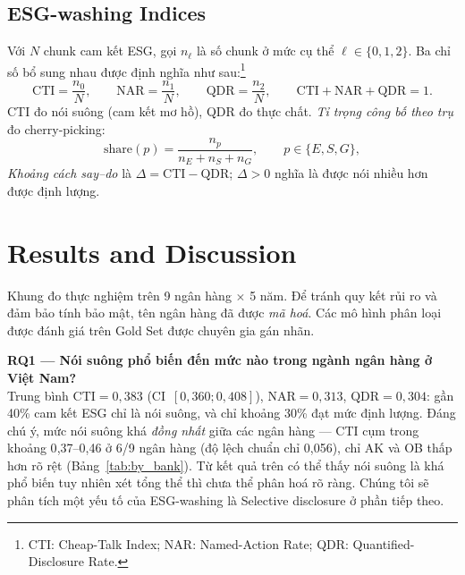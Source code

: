 \documentclass[runningheads]{llncs}
\begin{document}
\subsection{ESG-washing Indices}
Với $N$ chunk cam kết ESG, gọi $n_\ell$ là số chunk ở mức cụ thể $\ell\in\{0,1,2\}$. Ba chỉ số bổ sung nhau được định nghĩa như sau:\footnote{CTI: Cheap-Talk Index; NAR: Named-Action Rate; QDR: Quantified-Disclosure Rate.}
\begin{equation}
\mathrm{CTI}=\frac{n_0}{N},\qquad
\mathrm{NAR}=\frac{n_1}{N},\qquad
\mathrm{QDR}=\frac{n_2}{N},\qquad
\mathrm{CTI}+\mathrm{NAR}+\mathrm{QDR}=1.
\end{equation}
CTI đo nói suông (cam kết mơ hồ), QDR đo thực chất. \emph{Tỉ trọng công bố theo trụ} đo cherry-picking:
\begin{equation}
\mathrm{share}(p)=\frac{n_p}{n_E+n_S+n_G},\qquad p\in\{E,S,G\},
\end{equation}
\emph{Khoảng cách say--do} là $\Delta=\mathrm{CTI}-\mathrm{QDR}$; $\Delta>0$ nghĩa là được nói nhiều hơn được định lượng.


\section{Results and Discussion}
Khung đo thực nghiệm trên 9 ngân hàng $\times$ 5 năm. Để tránh quy kết rủi ro và đảm bảo tính bảo mật, tên ngân hàng đã được \emph{mã hoá}. Các mô hình phân loại được đánh giá trên Gold Set được chuyên gia gán nhãn.

\noindent\textbf{RQ1 --- Nói suông phổ biến đến mức nào trong ngành ngân hàng ở Việt Nam?}\\
Trung bình $\mathrm{CTI}=0{,}383$ (CI~$[0{,}360;0{,}408]$), $\mathrm{NAR}=0{,}313$, $\mathrm{QDR}=0{,}304$: gần 40\% cam kết ESG chỉ là nói suông, và chỉ khoảng 30\% đạt mức định lượng. Đáng chú ý, mức nói suông khá \emph{đồng nhất} giữa các ngân hàng --- CTI cụm trong khoảng 0{,}37--0{,}46 ở 6/9 ngân hàng (độ lệch chuẩn chỉ 0{,}056), chỉ AK và OB thấp hơn rõ rệt (Bảng~\ref{tab:by_bank}). Từ kết quả trên có thể thấy nói suông là khá phổ biến tuy nhiên xét tổng thể thì chưa thể phân hoá rõ ràng. Chúng tôi sẽ phân tích một yếu tố của ESG-washing là Selective disclosure \cite{marquis2016scrutiny} ở phần tiếp theo.
\end{document}
